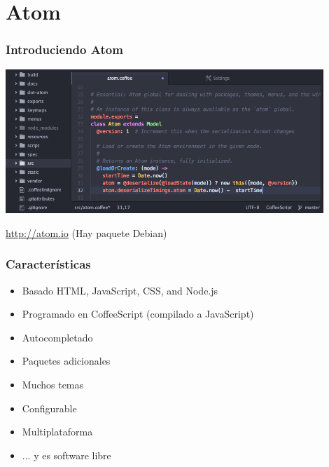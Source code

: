 %
%

\section{Atom}

\begin{frame}
\frametitle{Introduciendo Atom}

\includegraphics[width=12cm]{figs/atom.png}

\vspace{0.3cm}

  {\Large
    \url{http://atom.io} (Hay paquete Debian)
  }
  
\end{frame}

\begin{frame}
\frametitle{Características}

\begin{itemize}
  \item Basado HTML, JavaScript, CSS, and Node.js 
  \item Programado en CoffeeScript (compilado a JavaScript)
  \item Autocompletado
  \item Paquetes adicionales
  \item Muchos temas
  \item Configurable
  \item Multiplataforma
  \item ... y es software libre
\end{itemize}

\end{frame}






